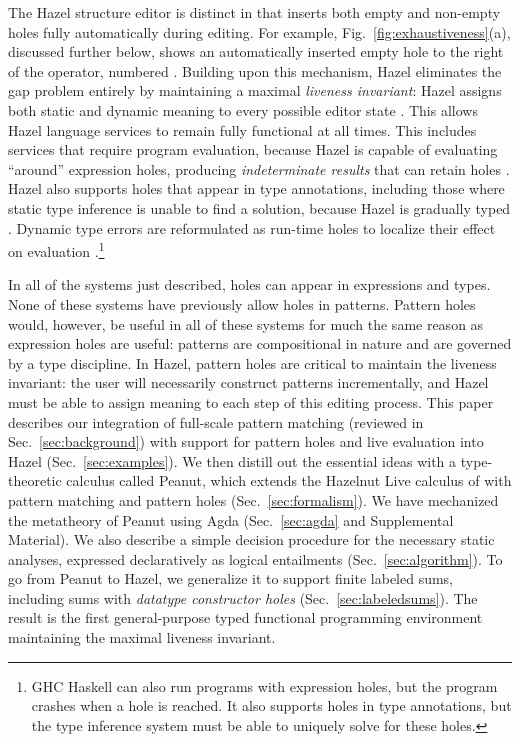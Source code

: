 The Hazel structure editor is distinct in that inserts both empty and non-empty holes fully automatically during editing.
For example, Fig.~\ref{fig:exhaustiveness}(a), discussed further below, shows an automatically inserted empty hole to the right of the \li{::} operator, numbered . Building upon this mechanism, Hazel eliminates the gap problem entirely by maintaining a maximal \emph{liveness invariant}: Hazel assigns both static and dynamic meaning to every possible editor state \cite{DBLP:conf/popl/OmarVHAH17, DBLP:journals/pacmpl/OmarVCH19}. This allows Hazel language services to remain fully functional at all
times. This includes services that require program evaluation, because Hazel is capable of evaluating ``around'' 
expression holes, producing \emph{indeterminate results} that can retain holes \cite{DBLP:journals/pacmpl/OmarVCH19}. Hazel also supports holes that appear in type annotations, including those where static type inference is unable to find a solution, because Hazel is gradually typed \cite{DBLP:conf/snapl/SiekVCB15}. Dynamic type errors are reformulated as run-time holes to localize their effect on evaluation \cite{DBLP:journals/pacmpl/OmarVCH19}.\footnote{GHC Haskell can also run programs with expression holes, but the program crashes when a hole is reached. It also supports holes in type annotations, but the type inference system must be able to uniquely solve for these holes.}

In all of the systems just described, 
holes can appear in expressions and types.
None of these systems have previously allow holes in patterns. 
Pattern holes would, however, be useful in all of these systems for much the same reason as expression holes are useful: patterns are compositional in nature and are governed by a type discipline. 
In Hazel, pattern holes are critical to maintain the liveness invariant: the user will necessarily construct patterns incrementally, and Hazel must be able to assign meaning to each step of this editing process.
This paper describes our integration of full-scale pattern matching (reviewed in Sec.~\ref{sec:background}) with support for pattern holes and live evaluation into Hazel (Sec.~\ref{sec:examples}). We then distill out the essential ideas with a type-theoretic calculus called Peanut, which extends the Hazelnut Live calculus of \citet{DBLP:journals/pacmpl/OmarVCH19} with pattern matching and pattern holes (Sec.~\ref{sec:formalism}). We have mechanized the metatheory of Peanut using Agda (Sec.~\ref{sec:agda} and Supplemental Material). We also describe a simple decision procedure for the necessary static analyses, expressed declaratively as logical entailments (Sec.~\ref{sec:algorithm}). To go from Peanut to Hazel, we generalize it to support finite labeled sums, including sums with \emph{datatype constructor holes} (Sec.~\ref{sec:labeledsums}). The result is the first general-purpose typed functional programming environment maintaining the maximal liveness invariant.

